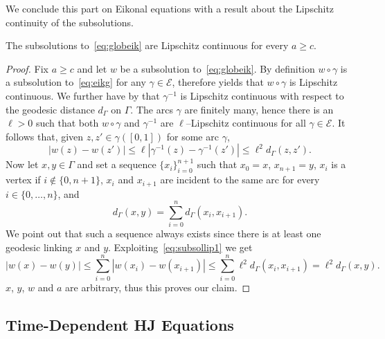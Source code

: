 \documentclass[11pt,a4paper,american]{article}
\newcommand{\Ecal}{\mathcal E}
\begin{document}
    We conclude this part on Eikonal equations with a result about the Lipschitz continuity of the subsolutions.

    \begin{prop}\label{subsollip}
        The subsolutions to~\cref{eq:globeik} are Lipschitz continuous for every $a\ge c$.
    \end{prop}
    \begin{proof}
        Fix $a\ge c$ and let $w$ be a subsolution to~\cref{eq:globeik}. By definition $w\circ\gamma$ is a subsolution to~\cref{eq:eikg} for any $\gamma\in\Ecal$, therefore \cite[Proposition 4.1]{BardiCapuzzo-Dolcetta97} yields that $w\circ\gamma$ is Lipschitz continuous. We further have by \cite[Lemma 3.1]{PozzaSiconolfi23} that $\gamma^{-1}$ is Lipschitz continuous with respect to the geodesic distance $d_\Gamma$ on $\Gamma$. The arcs $\gamma$ are finitely many, hence there is an $\ell>0$ such that both $w\circ\gamma$ and $\gamma^{-1}$ are $\ell$--Lipschitz continuous for all $\gamma\in\Ecal$. It follows that, given $z,z'\in\gamma([0,1])$ for some arc $\gamma$,
        \begin{equation}\label{eq:subsollip1}
            \left|w(z)-w\left(z'\right)\right|\le\ell\left|\gamma^{-1}(z)-\gamma^{-1}\left(z'\right)\right|\le\ell^2d_\Gamma\left(z,z'\right).
        \end{equation}
        Now let $x,y\in\Gamma$ and set a sequence $\{x_i\}_{i=0}^{n+1}$ such that $x_0=x$, $x_{n+1}=y$, $x_i$ is a vertex if $i\notin\{0,n+1\}$, $x_i$ and $x_{i+1}$ are incident to the same arc for every $i\in\{0,\dotsc,n\}$, and
        \begin{equation*}
            d_\Gamma(x,y)=\sum_{i=0}^n d_\Gamma(x_i,x_{i+1}).
        \end{equation*}
        We point out that such a sequence always exists since there is at least one geodesic linking $x$ and $y$. Exploiting~\cref{eq:subsollip1} we get
        \begin{equation*}
            |w(x)-w(y)|\le\sum_{i=0}^n|w(x_i)-w(x_{i+1})|\le\sum_{i=0}^n\ell^2d_\Gamma(x_i,x_{i+1})=\ell^2d_\Gamma(x,y).
        \end{equation*}
        $x$, $y$, $w$ and $a$ are arbitrary, thus this proves our claim.
    \end{proof}

    \subsection{Time-Dependent HJ Equations}\label{timeHJsec}
\end{document}
